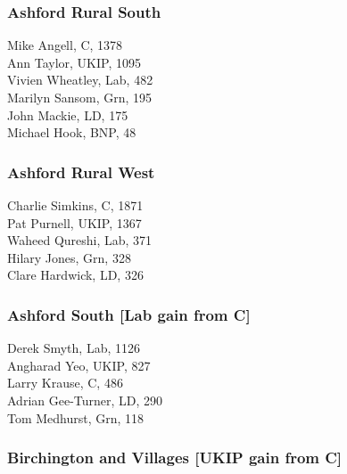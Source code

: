 \documentclass[a4paper,openany,10pt]{book}
\begin{document}
\subsubsection*{Ashford Rural South}



Mike Angell, C, 1378\\
Ann Taylor, UKIP, 1095\\
Vivien Wheatley, Lab, 482\\
Marilyn Sansom, Grn, 195\\
John Mackie, LD, 175\\
Michael Hook, BNP, 48\\


\subsubsection*{Ashford Rural West}



Charlie Simkins, C, 1871\\
Pat Purnell, UKIP, 1367\\
Waheed Qureshi, Lab, 371\\
Hilary Jones, Grn, 328\\
Clare Hardwick, LD, 326\\


\subsubsection*{Ashford South \hspace*{\fill}\nolinebreak[1]%
\enspace\hspace*{\fill}
[Lab gain from C]}



Derek Smyth, Lab, 1126\\
Angharad Yeo, UKIP, 827\\
Larry Krause, C, 486\\
Adrian Gee-Turner, LD, 290\\
Tom Medhurst, Grn, 118\\


\subsubsection*{Birchington and Villages \hspace*{\fill}\nolinebreak[1]%
\enspace\hspace*{\fill}
[UKIP gain from C]}
\end{document}
